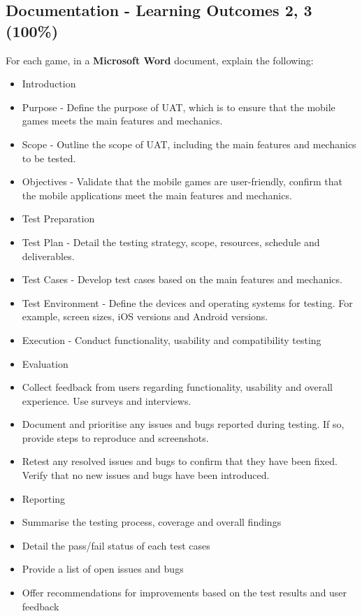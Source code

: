 \documentclass{article}
\begin{document}
\subsection*{Documentation - Learning Outcomes 2, 3 (100\%)}
\begin{itemize}
	For each game, in a \textbf{Microsoft Word} document, explain the following:
	\begin{itemize}
		\item Introduction
		\item Purpose - Define the purpose of UAT, which is to ensure that the mobile games meets the main features and mechanics.
		\item Scope - Outline the scope of UAT, including the main features and mechanics to be tested.
		\item Objectives - Validate that the mobile games are user-friendly, confirm that the mobile applications meet the main features and mechanics.

		\item Test Preparation
		\item Test Plan - Detail the testing strategy, scope, resources, schedule and deliverables.
		\item Test Cases - Develop test cases based on the main features and mechanics.
		\item Test Environment - Define the devices and operating systems for testing. For example, screen sizes, iOS versions and Android versions.
		
		\item Execution - Conduct functionality, usability and compatibility testing

		\item Evaluation
		\item Collect feedback from users regarding functionality, usability and overall experience. Use surveys and interviews.
		\item Document and prioritise any issues and bugs reported during testing. If so, provide steps to reproduce and screenshots.
		\item Retest any resolved issues and bugs to confirm that they have been fixed. Verify that no new issues and bugs have been introduced.

		\item Reporting
		\item Summarise the testing process, coverage and overall findings
		\item Detail the pass/fail status of each test cases
		\item Provide a list of open issues and bugs
		\item Offer recommendations for improvements based on the test results and user feedback

	\end{itemize}
\end{itemize}
\end{document}
